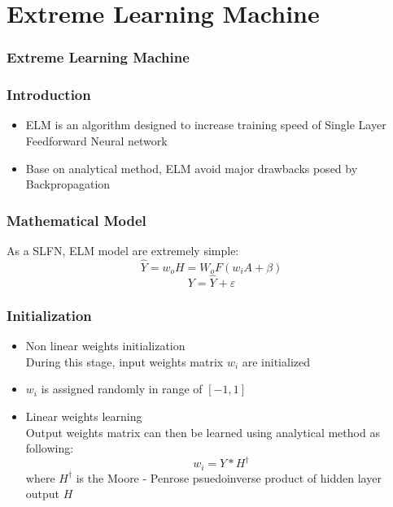 \documentclass{beamer}
\begin{document}
\section{Extreme Learning Machine}
\begin{frame}
    \frametitle{Extreme Learning Machine}
    \tableofcontents[currentsection]
\end{frame}
\begin{frame}
    \frametitle{Introduction}
    \begin{itemize}
        \item<1-> ELM is an algorithm designed to increase training speed of Single Layer Feedforward Neural network
        \item<2-> Base on analytical method, ELM avoid major drawbacks posed by Backpropagation \cite{huang_extreme_2016}
    \end{itemize}
\end{frame}
\begin{frame}
    \frametitle{Mathematical Model}
    As a SLFN, ELM model are extremely simple:
    \begin{equation}
        \hat{Y} = w_o H=W_o F(w_i A + \beta)
    \end{equation}
    \begin{equation}
        Y = \hat{Y} + \varepsilon
    \end{equation}
\end{frame}
\begin{frame}
    \frametitle{Initialization\cite{huang_extreme_2016}}
    \begin{itemize}[<+->]
        \item Non linear weights initialization\\
        During this stage, input weights matrix $w_i$ are initialized
        \item $w_i$ is assigned randomly in range of $[-1,1]$
        \item<2> Linear weights learning\\
        Output weights matrix can then be learned using analytical method as following:
        \begin{equation}
            w_i = Y * H^\dagger
        \end{equation}
        where $H^\dagger$ is the Moore - Penrose psuedoinverse product of hidden layer output $H$
    \end{itemize}
\end{frame}
\end{document}
